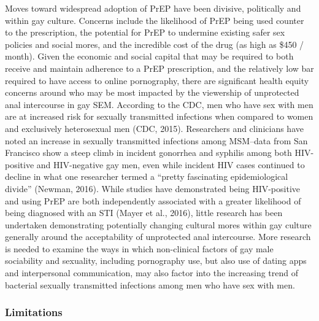\documentclass[]{article}
\begin{document}
Moves toward widespread adoption of PrEP have been divisive, politically
and within gay culture. Concerns include the likelihood of PrEP being
used counter to the prescription, the potential for PrEP to undermine
existing safer sex policies and social mores, and the incredible cost of
the drug (as high as \$450 / month). Given the economic and social
capital that may be required to both receive and maintain adherence to a
PrEP prescription, and the relatively low bar required to have access to
online pornography, there are significant health equity concerns around
who may be most impacted by the viewership of unprotected anal
intercourse in gay SEM. According to the CDC, men who have sex with men
are at increased risk for sexually transmitted infections when compared
to women and exclusively heterosexual men (CDC, 2015). Researchers and
clinicians have noted an increase in sexually transmitted infections
among MSM--data from San Francisco show a steep climb in incident
gonorrhea and syphilis among both HIV-positive and HIV-negative gay men,
even while incident HIV cases continued to decline in what one
researcher termed a ``pretty fascinating epidemiological divide''
(Newman, 2016). While studies have demonstrated being HIV-positive and
using PrEP are both independently associated with a greater likelihood
of being diagnosed with an STI (Mayer et al., 2016), little research has
been undertaken demonstrating potentially changing cultural mores within
gay culture generally around the acceptability of unprotected anal
intercourse. More research is needed to examine the ways in which
non-clinical factors of gay male sociability and sexuality, including
pornography use, but also use of dating apps and interpersonal
communication, may also factor into the increasing trend of bacterial
sexually transmitted infections among men who have sex with men.

\subsubsection{Limitations}\label{limitations}
\end{document}
